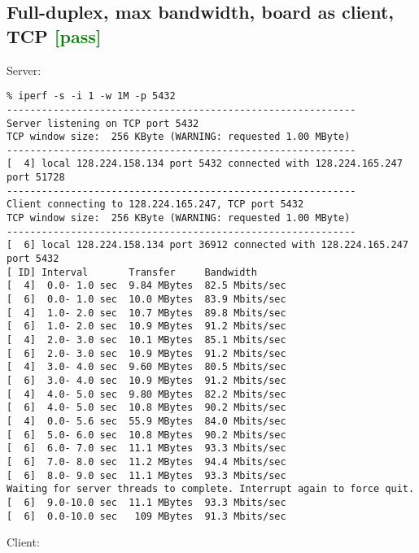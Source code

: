 \documentclass[a4paper]{report}
\begin{document}
\subsection{Full-duplex, max bandwidth, board as client, TCP \textcolor{green}{[pass]}}
Server:
\begin{lstlisting}
% iperf -s -i 1 -w 1M -p 5432
------------------------------------------------------------
Server listening on TCP port 5432
TCP window size:  256 KByte (WARNING: requested 1.00 MByte)
------------------------------------------------------------
[  4] local 128.224.158.134 port 5432 connected with 128.224.165.247 port 51728
------------------------------------------------------------
Client connecting to 128.224.165.247, TCP port 5432
TCP window size:  256 KByte (WARNING: requested 1.00 MByte)
------------------------------------------------------------
[  6] local 128.224.158.134 port 36912 connected with 128.224.165.247 port 5432
[ ID] Interval       Transfer     Bandwidth
[  4]  0.0- 1.0 sec  9.84 MBytes  82.5 Mbits/sec
[  6]  0.0- 1.0 sec  10.0 MBytes  83.9 Mbits/sec
[  4]  1.0- 2.0 sec  10.7 MBytes  89.8 Mbits/sec
[  6]  1.0- 2.0 sec  10.9 MBytes  91.2 Mbits/sec
[  4]  2.0- 3.0 sec  10.1 MBytes  85.1 Mbits/sec
[  6]  2.0- 3.0 sec  10.9 MBytes  91.2 Mbits/sec
[  4]  3.0- 4.0 sec  9.60 MBytes  80.5 Mbits/sec
[  6]  3.0- 4.0 sec  10.9 MBytes  91.2 Mbits/sec
[  4]  4.0- 5.0 sec  9.80 MBytes  82.2 Mbits/sec
[  6]  4.0- 5.0 sec  10.8 MBytes  90.2 Mbits/sec
[  4]  0.0- 5.6 sec  55.9 MBytes  84.0 Mbits/sec
[  6]  5.0- 6.0 sec  10.8 MBytes  90.2 Mbits/sec
[  6]  6.0- 7.0 sec  11.1 MBytes  93.3 Mbits/sec
[  6]  7.0- 8.0 sec  11.2 MBytes  94.4 Mbits/sec
[  6]  8.0- 9.0 sec  11.1 MBytes  93.3 Mbits/sec
Waiting for server threads to complete. Interrupt again to force quit.
[  6]  9.0-10.0 sec  11.1 MBytes  93.3 Mbits/sec
[  6]  0.0-10.0 sec   109 MBytes  91.3 Mbits/sec
\end{lstlisting}
Client:
\end{document}
